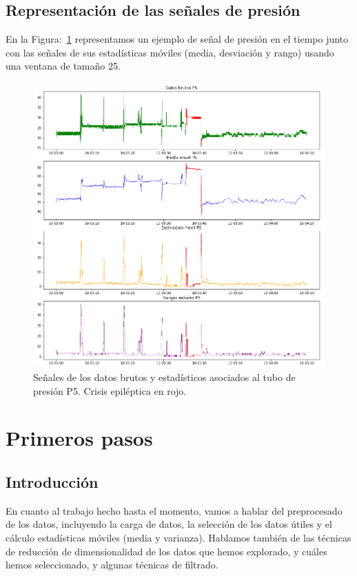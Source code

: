 \documentclass[a4paper,12pt,twoside,oldfontcommands]{memoir}
\begin{document}
\section{Representación de las señales de presión}
En la Figura:~\ref{fig:senalP5} representamos un ejemplo de señal de presión en el tiempo junto con las señales de sus estadísticas móviles (media, desviación y rango) usando una ventana de tamaño 25. 
\begin{figure}
    \centering
    \includegraphics[width=1\textwidth]{images/SenalP5.png}
    \caption{Señales de los datos brutos y estadísticos asociados al tubo de presión P5. Crisis epiléptica en rojo.}
    \label{fig:senalP5}
\end{figure}

\chapter{Primeros pasos}
\section{Introducción}
En cuanto al trabajo hecho hasta el momento, vamos a hablar del preprocesado de los datos, incluyendo la carga de datos, la selección de los datos útiles y el cálculo estadísticas móviles (media y varianza). Hablamos también de las técnicas de reducción de dimensionalidad de los datos que hemos explorado, y cuáles hemos seleccionado, y algunas técnicas de filtrado. 
\end{document}
